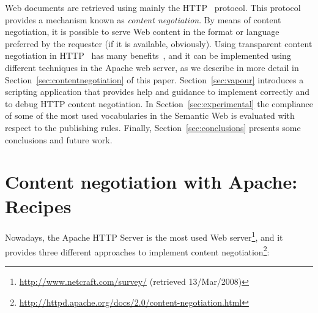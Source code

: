 \documentclass{../templates/llncs}
\begin{document}
Web documents are retrieved using mainly the HTTP~\cite{HTTP} 
protocol. This protocol provides a mechanism known as \textit{content negotiation}. 
By means of content negotiation, it is possible to serve Web content in the format or 
language preferred by the requester (if it is available, obviously). Using transparent content negotiation 
in HTTP~\cite{Holtman1998} has many benefits~\cite{Seshan1998}, and it can be implemented
using different techniques in the Apache web server, as we describe in more detail in 
Section~\ref{sec:contentnegotiation} of this paper. Section~\ref{sec:vapour} introduces 
a scripting application that provides help and guidance to implement correctly and to debug
HTTP content negotiation. In Section~\ref{sec:experimental} the
compliance of some of the most used
vocabularies in the Semantic Web is evaluated with respect to the publishing rules. Finally, Section~\ref{sec:conclusions} presents 
some conclusions and future work.


\section{\label{sec:contentnegotiation}Content negotiation with Apache: Recipes}


Nowadays, the Apache HTTP Server is the most used Web server\footnote{\url{http://www.netcraft.com/survey/} (retrieved 13/Mar/2008)}, 
and it provides three different approaches to implement content negotiation\footnote{\url{http://httpd.apache.org/docs/2.0/content-negotiation.html}}:
\end{document}
